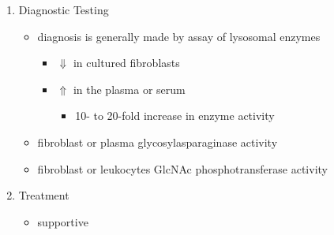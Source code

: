 \documentclass{scrartcl}
\begin{document}
\begin{enumerate}
\item Diagnostic Testing
\label{sec:orga0d3fd8}
\begin{itemize}
\item diagnosis is generally made by assay of lysosomal enzymes
\begin{itemize}
\item \(\Downarrow\) in cultured fibroblasts
\item \(\Uparrow\) in the plasma or serum
\begin{itemize}
\item 10- to 20-fold increase in enzyme activity
\end{itemize}
\end{itemize}
\item fibroblast or plasma glycosylasparaginase activity
\item fibroblast or leukocytes GlcNAc phosphotransferase activity
\end{itemize}

\item Treatment
\label{sec:org8465229}
\begin{itemize}
\item supportive
\end{itemize}
\end{enumerate}
\end{document}
